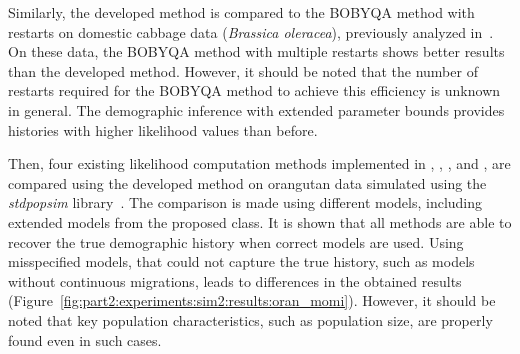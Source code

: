 \begin{table}[ht]
    \centering
    \caption{Results of 100 repeats of different methods for parameter tuning in case of model 2 with inbreeding for two puma populations}
\end{table}

Similarly, the developed method is compared to the BOBYQA method with restarts on domestic cabbage data (\textit{Brassica oleracea}), previously analyzed in~\cite{blischak2020inferring}.
On these data, the BOBYQA method with multiple restarts shows better results than the developed method.
However, it should be noted that the number of restarts required for the BOBYQA method to achieve this efficiency is unknown in general.
The demographic inference with extended parameter bounds provides histories with higher likelihood values than before.

Then, four existing likelihood computation methods implemented in \dadi, \moments, \momi, and \momentsLD, are compared using the developed method on orangutan data simulated using the \textit{stdpopsim} library~\cite{adrion2020community,lauterbur2023expanding}.
The comparison is made using different models, including extended models from the proposed class.
It is shown that all methods are able to recover the true demographic history when correct models are used.
Using misspecified models, that could not capture the true history, such as models without continuous migrations, leads to differences in the obtained results (Figure~\ref{fig:part2:experiments:sim2:results:oran_momi}).
However, it should be noted that key population characteristics, such as population size, are properly found even in such cases.

